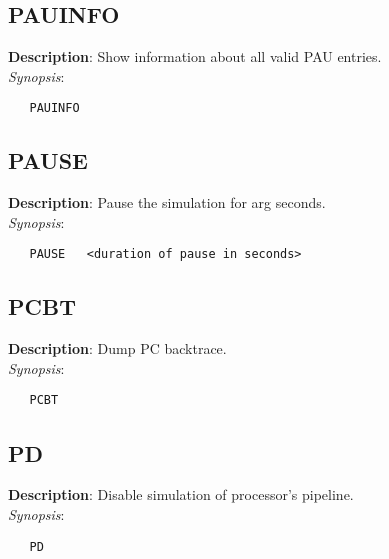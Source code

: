 \subsection{\bf PAUINFO}
\label{manpages:PAUINFO}
\label{manpages:pauinfo}
\vspace{-0.2in}
{\bf Description}: 	Show information about all valid PAU entries.\\[1.5ex]
{\em Synopsis}:
\vspace{-0.2in}
\scriptsize
\begin{verbatim}
   PAUINFO   			
\end{verbatim}
\normalsize
\vspace{-0.2in}


\subsection{\bf PAUSE}
\label{manpages:PAUSE}
\label{manpages:pause}
\vspace{-0.2in}
{\bf Description}: 	Pause the simulation for arg seconds.\\[1.5ex]
{\em Synopsis}:
\vspace{-0.2in}
\scriptsize
\begin{verbatim}
   PAUSE   <duration of pause in seconds>		
\end{verbatim}
\normalsize
\vspace{-0.2in}


\subsection{\bf PCBT}
\label{manpages:PCBT}
\label{manpages:pcbt}
\vspace{-0.2in}
{\bf Description}: 	Dump PC backtrace.\\[1.5ex]
{\em Synopsis}:
\vspace{-0.2in}
\scriptsize
\begin{verbatim}
   PCBT   	
\end{verbatim}
\normalsize
\vspace{-0.2in}


\subsection{\bf PD}
\label{manpages:PD}
\label{manpages:pd}
\vspace{-0.2in}
{\bf Description}: 	Disable simulation of processor's pipeline.\\[1.5ex]
{\em Synopsis}:
\vspace{-0.2in}
\scriptsize
\begin{verbatim}
   PD   			
\end{verbatim}
\normalsize
\vspace{-0.2in}


